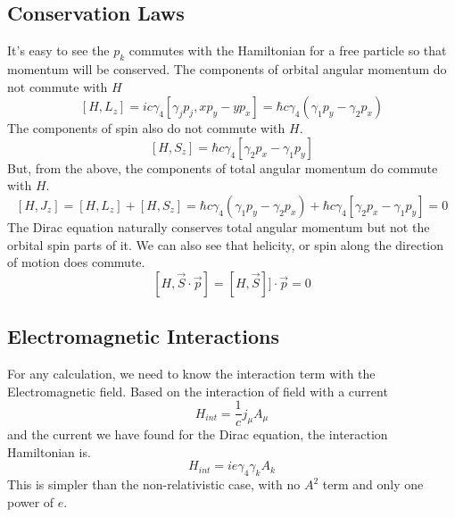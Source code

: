 \documentclass{report}
\begin{document}
\subsection{Conservation Laws}
It's easy to see the $p_{k}$ commutes with the Hamiltonian for a free particle so that momentum will be conserved. The components of orbital angular momentum do not commute with $H$
\begin{equation}
	\left[ H, L_{z} \right] = ic \gamma_4 \left[ \gamma_{j} p_{j}, xp_{y} - yp_{x} \right] = \hbar c \gamma_4 \left( \gamma_1 p_{y} - \gamma_2 p_{x} \right)
\end{equation}
The components of spin also do not commute with $H$.
\begin{equation}
	\left[ H, S_{z} \right] = \hbar c \gamma_4 \left[ \gamma_2 p_{x} - \gamma_1 p_{y} \right]
\end{equation}
But, from the above, the components of total angular momentum do commute with $H$.
\begin{equation}
	\left[ H, J_{z} \right] = \left[ H, L_{z} \right] + \left[ H, S_{z} \right] = \hbar c \gamma_4 \left( \gamma_1 p_{y} - \gamma_2 p_{x} \right) + \hbar c \gamma_4 \left[ \gamma_2 p_{x} - \gamma_1 p_{y} \right] = 0
\end{equation}
The Dirac equation naturally conserves total angular momentum but not the orbital spin parts of it. We can also see that helicity, or spin along the direction of motion does commute.
\begin{equation}
	\left[ H, \vec{S} \cdot \vec{p} \right] = \left[ H, \vec{S} \right] ]\cdot\vec{p} = 0
\end{equation}
\subsection{Electromagnetic Interactions}
For any calculation, we need to know the interaction term with the Electromagnetic field. Based on the interaction of field with a current
\begin{equation}
	H_{int} = \frac{1}{c}j_{\mu}A_{\mu}
\end{equation}
and the current we have found for the Dirac equation, the interaction Hamiltonian is.
\begin{equation}
	H_{int} = i e \gamma_4 \gamma_{k}A_{k}
\end{equation}
This is simpler than the non-relativistic case, with no $\displaystyle A^2$ term and only one power of $e$.
\end{document}
